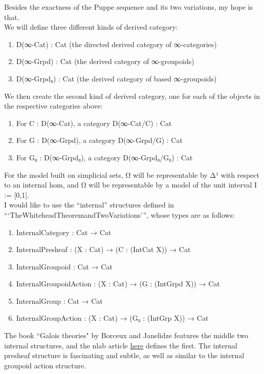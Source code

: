 \documentclass{book}
\theoremstyle{definition}
\begin{document}
Besides the exactness of the Puppe sequence and its two variations, my hope is that.\\

We will define three different kinds of derived category:\\

\begin{enumerate}
\item D(∞-Cat) : Cat (the directed derived category of ∞-categories)
\item D(∞-Grpd) : Cat (the derived category of ∞-groupoids)
\item D(∞-Grpd₀) : Cat (the derived category of based ∞-groupoids)
\end{enumerate}

We then create the second kind of derived category, one for each of the objects in the respective categories above:

\begin{enumerate}
\item For C : D(∞-Cat), a category D(∞-Cat/C) : Cat
\item For G : D(∞-Grpd), a category D(∞-Grpd/G) : Cat
\item For G₀ : D(∞-Grpd₀), a category D(∞-Grpd₀/G₀) : Cat
\end{enumerate}

For the model built on simplicial sets, Ω⃗ will be representable by Δ¹ with respect to an internal hom, and Ω⃡ will be representable by a model of the unit interval I := [0,1].\\

I would like to use the ``internal'' structures defined in ```TheWhiteheadTheoremandTwoVariations''', whose types are as follows:\\

\begin{enumerate}
\item InternalCategory : Cat → Cat 
\item InternalPresheaf : (X : Cat) → (C : (IntCat X)) → Cat
\item InternalGroupoid : Cat → Cat
\item InternalGroupoidAction : (X : Cat) → (G : (IntGrpd X)) → Cat
\item InternalGroup : Cat → Cat
\item InternalGroupAction : (X : Cat) → (G₀ : (IntGrp X)) → Cat
\end{enumerate}

The book ``Galois theories" by Borceux and Janelidze features the middle two internal structures, and the nlab article \href{https://ncatlab.org/nlab/show/internal+category}{here} defines the first. The internal presheaf structure is fascinating and subtle, as well as similar to the internal groupoid action structure.\\
\end{document}
